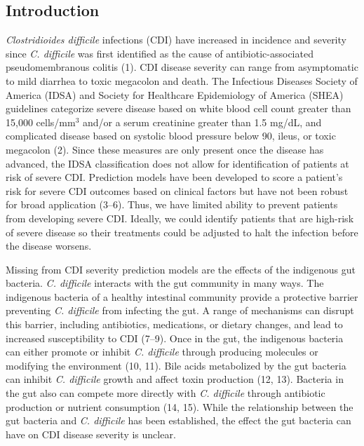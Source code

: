 \documentclass[
  12pt,
]{article}
\begin{document}
\newpage

\hypertarget{introduction}{%
\subsection{Introduction}\label{introduction}}

\emph{Clostridioides difficile} infections (CDI) have increased in
incidence and severity since \emph{C. difficile} was first identified as
the cause of antibiotic-associated pseudomembranous colitis (1). CDI
disease severity can range from asymptomatic to mild diarrhea to toxic
megacolon and death. The Infectious Diseases Society of America (IDSA)
and Society for Healthcare Epidemiology of America (SHEA) guidelines
categorize severe disease based on white blood cell count greater than
15,000 cells/mm\(^3\) and/or a serum creatinine greater than 1.5 mg/dL,
and complicated disease based on systolic blood pressure below 90,
ileus, or toxic megacolon (2). Since these measures are only present
once the disease has advanced, the IDSA classification does not allow
for identification of patients at risk of severe CDI. Prediction models
have been developed to score a patient's risk for severe CDI outcomes
based on clinical factors but have not been robust for broad application
(3--6). Thus, we have limited ability to prevent patients from
developing severe CDI. Ideally, we could identify patients that are
high-risk of severe disease so their treatments could be adjusted to
halt the infection before the disease worsens.

Missing from CDI severity prediction models are the effects of the
indigenous gut bacteria. \emph{C. difficile} interacts with the gut
community in many ways. The indigenous bacteria of a healthy intestinal
community provide a protective barrier preventing \emph{C. difficile}
from infecting the gut. A range of mechanisms can disrupt this barrier,
including antibiotics, medications, or dietary changes, and lead to
increased susceptibility to CDI (7--9). Once in the gut, the indigenous
bacteria can either promote or inhibit \emph{C. difficile} through
producing molecules or modifying the environment (10, 11). Bile acids
metabolized by the gut bacteria can inhibit \emph{C. difficile} growth
and affect toxin production (12, 13). Bacteria in the gut also can
compete more directly with \emph{C. difficile} through antibiotic
production or nutrient consumption (14, 15). While the relationship
between the gut bacteria and \emph{C. difficile} has been established,
the effect the gut bacteria can have on CDI disease severity is unclear.
\end{document}
